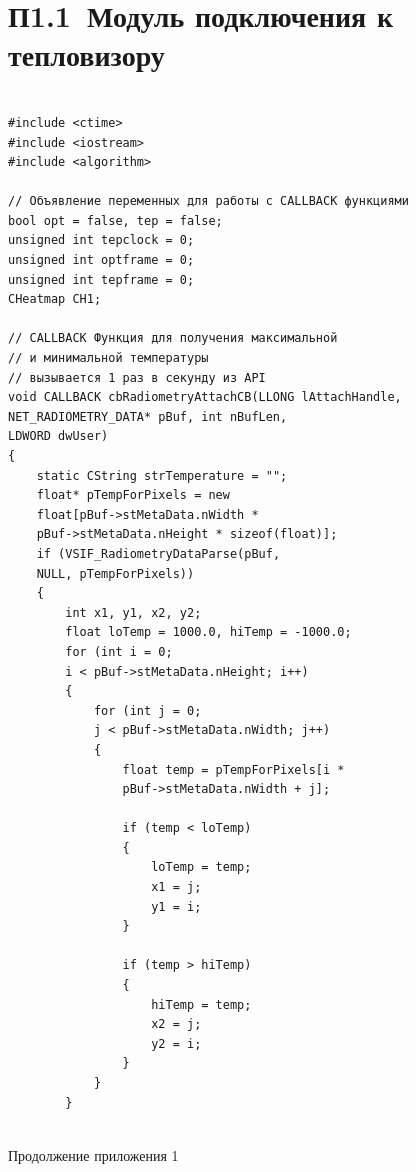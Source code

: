 \documentclass[14pt, a4paper]{extreport}
\begin{document}
\section*{П1.1~Модуль подключения к тепловизору}
\begin{Verbatim}[fontseries=c, fontsize=\fontsize{10pt}{12pt}\selectfont]

#include <ctime>
#include <iostream>
#include <algorithm>

// Объявление переменных для работы с CALLBACK функциями
bool opt = false, tep = false;
unsigned int tepclock = 0;
unsigned int optframe = 0;
unsigned int tepframe = 0;
CHeatmap CH1;

// CALLBACK Функция для получения максимальной 
// и минимальной температуры
// вызывается 1 раз в секунду из API
void CALLBACK cbRadiometryAttachCB(LLONG lAttachHandle, 
NET_RADIOMETRY_DATA* pBuf, int nBufLen, 
LDWORD dwUser)
{
	static CString strTemperature = "";
	float* pTempForPixels = new 
	float[pBuf->stMetaData.nWidth * 
	pBuf->stMetaData.nHeight * sizeof(float)];
	if (VSIF_RadiometryDataParse(pBuf, 
	NULL, pTempForPixels))
	{
		int x1, y1, x2, y2;
		float loTemp = 1000.0, hiTemp = -1000.0;
		for (int i = 0; 
		i < pBuf->stMetaData.nHeight; i++)
		{
			for (int j = 0; 
			j < pBuf->stMetaData.nWidth; j++)
			{
				float temp = pTempForPixels[i * 
				pBuf->stMetaData.nWidth + j];
				
				if (temp < loTemp)
				{
					loTemp = temp;
					x1 = j;
					y1 = i;
				}
				
				if (temp > hiTemp)
				{
					hiTemp = temp;
					x2 = j;
					y2 = i;
				}
			}
		}
	
\end{Verbatim}
\begin{flushright} \noindent Продолжение приложения 1 \end{flushright}
\end{document}
